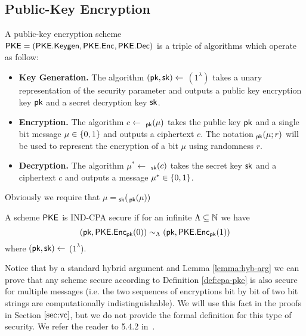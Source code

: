 \subsection{Public-Key Encryption}
A public-key encryption scheme \\
$\mathsf{PKE} = (\mathsf{PKE.Keygen}, \mathsf{PKE.Enc}, \mathsf{PKE.Dec})$ is a triple of algorithms which operate as follow:
\begin{itemize}
\item \textbf{Key Generation.} The algorithm $(\mathsf{pk},\mathsf{sk})\leftarrow$ \PKEKeygen$(1^{\lambda})$ takes a unary representation of the security parameter and outputs a public key encryption key $\mathsf{pk}$ and a secret decryption key $\mathsf{sk}$.
\item \textbf{Encryption.} The algorithm $c\leftarrow$ \PKEEnc$_{\mathsf{pk}}(\mu)$ takes the public key $\mathsf{pk}$ and a single bit message $\mu\in\{0, 1\}$ and outputs a ciphertext $c$. The notation \PKEEnc$_{\mathsf{pk}}(\mu;r)$ will be used to represent the encryption of a bit $\mu$ using randomness $r$. 
\item \textbf{Decryption.} The algorithm $\mu^*\leftarrow$ \PKEDec$_{\mathsf{sk}}(c)$ takes the secret key $\mathsf{sk}$ and a ciphertext $c$ and outputs a message $\mu^*\in\{0, 1\}$. 
\end{itemize}
Obviously we require that $\mu=$\PKEDec$_{\mathsf{sk}}($\PKEEnc$_{\mathsf{pk}}(\mu))$

\begin{definition}
\label{def:cpa-pke}
\label{def:cpa-he}
A scheme $\mathsf{PKE}$ is IND-CPA secure if for an infinite $\Lambda \subseteq \mathbb{N}$ we have
$$ (\mathsf{pk},\mathsf{PKE.Enc}_{\mathsf{pk}}(0)) \sim_{\Lambda} (\mathsf{pk},\mathsf{PKE.Enc}_{\mathsf{pk}}(1)) $$
where $(\mathsf{pk},\mathsf{sk})\leftarrow$ \PKEKeygen($1^{\lambda}$).
\end{definition}

\begin{remark}
\label{rem:cpa-multiple}
Notice that by a standard hybrid argument and Lemma \ref{lemma:hyb-arg} we can prove that any scheme secure according to Definition \ref{def:cpa-pke} is also secure for multiple messages (i.e. the two sequences of encryptions bit by bit of two bit strings are computationally indistinguishable).
We will use this fact in the proofs in Section $\ref{sec:vc}$, but we do not provide the formal definition for this type of security. We refer the reader to 5.4.2 in~\cite{goldreich2009foundations2}.
\end{remark}